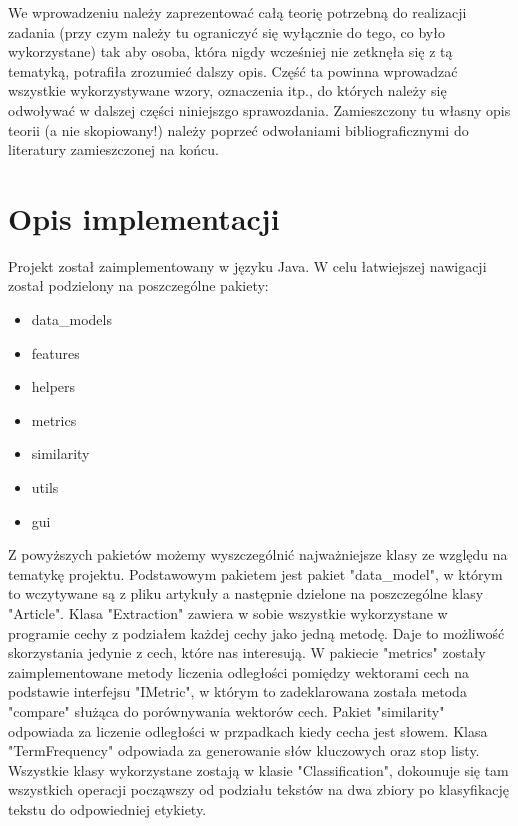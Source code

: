 \documentclass{classrep}
\begin{document}
\newline \newline
{\color{blue}
We wprowadzeniu należy zaprezentować całą teorię potrzebną do realizacji
zadania (przy czym należy tu ograniczyć się wyłącznie do tego, co było
wykorzystane) tak aby osoba, która nigdy wcześniej nie zetknęła się z tą
tematyką, potrafiła zrozumieć dalszy opis. Część ta powinna wprowadzać
wszystkie wykorzystywane wzory, oznaczenia itp., do których należy się
odwoływać w dalszej części niniejszgo sprawozdania. Zamieszczony tu własny
opis teorii (a nie skopiowany!) należy poprzeć odwołaniami bibliograficznymi
do literatury zamieszczonej na końcu. }

\section{Opis implementacji}
Projekt został zaimplementowany w języku Java. W celu łatwiejszej nawigacji został podzielony na poszczególne pakiety:
\begin{itemize}
    \item data\_models
    \item features
    \item helpers
    \item metrics
    \item similarity
    \item utils
    \item gui
\end{itemize}
Z powyższych pakietów możemy wyszczególnić najważniejsze klasy ze względu na tematykę projektu. Podstawowym pakietem
jest pakiet "data\_model", w którym to wczytywane są z pliku artykuły a następnie dzielone na poszczególne klasy "Article".
Klasa "Extraction" zawiera w sobie wszystkie wykorzystane w programie cechy z podziałem każdej cechy jako jedną metodę.
Daje to możliwość skorzystania jedynie z cech, które nas interesują. W pakiecie "metrics" zostały zaimplementowane metody
liczenia odległości pomiędzy wektorami cech na podstawie interfejsu "IMetric", w którym to zadeklarowana została
metoda "compare" służąca do porównywania wektorów cech. Pakiet "similarity" odpowiada za liczenie odległości w
przpadkach kiedy cecha jest słowem. Klasa "TermFrequency" odpowiada za generowanie słów kluczowych oraz stop listy.
Wszystkie klasy wykorzystane zostają w klasie "Classification", dokounuje się tam wszystkich operacji począwszy od podziału
tekstów na dwa zbiory po klasyfikację tekstu do odpowiedniej etykiety.
\end{document}
